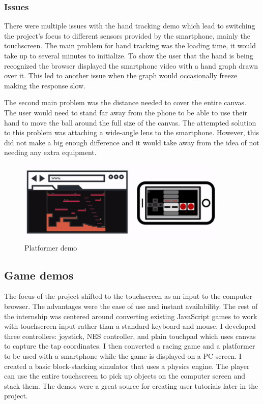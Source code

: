 \documentclass{l4proj}
\begin{document}
\subsubsection{Issues}
There were multiple issues with the hand tracking demo which lead to switching the project's focus to different sensors provided by the smartphone, mainly the touchscreen. The main problem for hand tracking was the loading time, it would take up to several minutes to initialize. To show the user that the hand is being recognized the browser displayed the smartphone video with a hand graph drawn over it. This led to another issue when the graph would occasionally freeze making the response slow. \par
The second main problem was the distance needed to cover the entire canvas. The user would need to stand far away from the phone to be able to use their hand to move the ball around the full size of the canvas. The attempted solution to this problem was attaching a wide-angle lens to the smartphone. However, this did not make a big enough difference and it would take away from the idea of not needing any extra equipment.

\begin{figure}[h!]
    \centering
    \includegraphics[width=10cm]{./images/demo2.png}
    \caption{Platformer demo}
    \label{fig:platform}
\end{figure}

\subsection{Game demos}
The focus of the project shifted to the touchscreen as an input to the computer browser. The advantages were the ease of use and instant availability. The rest of the internship was centered around converting existing JavaScript games to work with touchscreen input rather than a standard keyboard and mouse. I developed three controllers: joystick, NES controller, and plain touchpad which uses canvas to capture the tap coordinates. I then converted a racing game and a platformer to be used with a smartphone while the game is displayed on a PC screen. I created a basic block-stacking simulator that uses a physics engine. The player can use the entire touchscreen to pick up objects on the computer screen and stack them. The demos were a great source for creating user tutorials later in the project.
\end{document}
